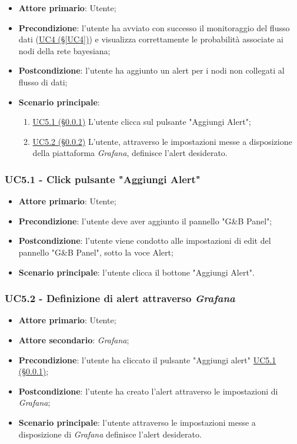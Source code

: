 \begin{itemize}
	\item \textbf{Attore primario}: Utente;
	\item \textbf{Precondizione}:
	l'utente ha avviato con successo il monitoraggio del flusso dati (\hyperref[UC4]				{UC4 (§\ref*{UC4})}) e visualizza correttamente le probabilità associate ai nodi della rete bayesiana;
	\item \textbf{Postcondizione}: l'utente ha aggiunto un alert per i nodi non collegati al flusso di dati;
	\item \textbf{Scenario principale}:
	\begin{enumerate}
		\item \hyperref[UC5.1]{UC5.1 (§\ref*{UC5.1})}  L'utente clicca sul pulsante "Aggiungi Alert";
		\item \hyperref[UC5.2]{UC5.2 (§\ref*{UC5.2})} L'utente, attraverso le impostazioni messe a disposizione della piattaforma \textit{Grafana}, definisce l'alert desiderato.
	\end{enumerate}
	
\end{itemize}

\subsubsection{UC5.1 - Click pulsante "Aggiungi Alert"}\label{UC5.1}
\begin{itemize}
	\item \textbf{Attore primario}: Utente;
	\item \textbf{Precondizione}: l'utente deve aver aggiunto il pannello "G\&B Panel";
	\item \textbf{Postcondizione}: l'utente viene condotto alle impostazioni di edit del pannello 
	"G\&B Panel", sotto la voce Alert;
	\item \textbf{Scenario principale}: l'utente clicca il bottone "Aggiungi Alert".
\end{itemize}

\subsubsection{UC5.2 - Definizione di alert attraverso \textit{Grafana}}\label{UC5.2}
\begin{itemize}
	\item \textbf{Attore primario}: Utente;
	\item \textbf{Attore secondario}: \textit{Grafana};
	\item \textbf{Precondizione}: l'utente ha cliccato il pulsante "Aggiungi alert" \hyperref[UC5.1]{UC5.1 (§\ref*{UC5.1})};
	\item \textbf{Postcondizione}: l'utente ha creato l'alert attraverso le impostazioni di \textit{Grafana};
	\item \textbf{Scenario principale}: l'utente attraverso le impostazioni messe a disposizione di \textit{Grafana} definisce l'alert desiderato.
\end{itemize}

